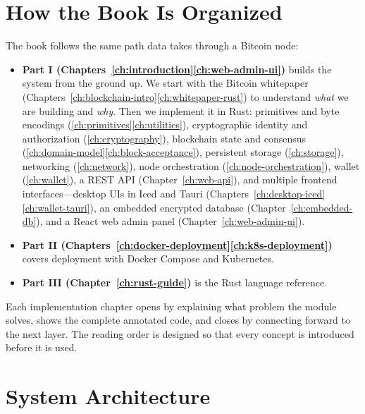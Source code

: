 \section{How the Book Is Organized}
\label{sec:book-organization}

The book follows the same path data takes through a Bitcoin node:

\begin{itemize}
  \item \textbf{Part I (Chapters~\ref{ch:introduction}\textendash\ref{ch:web-admin-ui})} builds the system from the ground up. We start with the Bitcoin whitepaper (Chapters~\ref{ch:blockchain-intro}\textendash\ref{ch:whitepaper-rust}) to understand \emph{what} we are building and \emph{why}. Then we implement it in Rust: primitives and byte encodings (\ref{ch:primitives}\textendash\ref{ch:utilities}), cryptographic identity and authorization (\ref{ch:cryptography}), blockchain state and consensus (\ref{ch:domain-model}\textendash\ref{ch:block-acceptance}), persistent storage (\ref{ch:storage}), networking (\ref{ch:network}), node orchestration (\ref{ch:node-orchestration}), wallet (\ref{ch:wallet}), a REST API (Chapter~\ref{ch:web-api}), and multiple frontend interfaces---desktop UIs in Iced and Tauri (Chapters~\ref{ch:desktop-iced}\textendash\ref{ch:wallet-tauri}), an embedded encrypted database (Chapter~\ref{ch:embedded-db}), and a React web admin panel (Chapter~\ref{ch:web-admin-ui}).
  \item \textbf{Part II (Chapters~\ref{ch:docker-deployment}\textendash\ref{ch:k8s-deployment})} covers deployment with Docker Compose and Kubernetes.
  \item \textbf{Part III (Chapter~\ref{ch:rust-guide})} is the Rust language reference.
\end{itemize}

Each implementation chapter opens by explaining what problem the module solves, shows the complete annotated code, and closes by connecting forward to the next layer. The reading order is designed so that every concept is introduced before it is used.

\section{System Architecture}
\label{sec:system-architecture}

